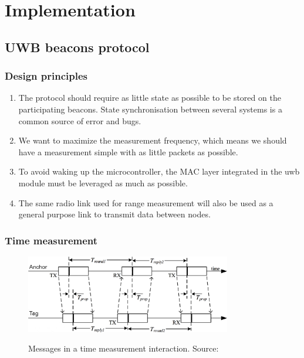 \documentclass[a4paper, 12pt]{scrreprt}
\begin{document}
\chapter{Implementation}

\section{UWB beacons protocol}

\subsection{Design principles}

\begin{enumerate}
    \item The protocol should require as little state as possible to be stored on the participating beacons.
        State synchronisation between several systems is a common source of error and bugs.
    \item We want to maximize the measurement frequency, which means we should have a measurement simple with as little packets as possible.
    \item To avoid waking up the microcontroller, the MAC layer integrated in the \gls{uwb} module must be leveraged as much as possible.
    \item The same radio link used for range measurement will also be used as a general purpose link to transmit data between nodes.
\end{enumerate}

\subsection{Time measurement}

\begin{figure}[h]
    \centering
    \includegraphics[width=0.8\textwidth]{figures/ranging_protocol.png}
    \label{fig:ranging_protocol}
    \caption[Ranging protocol]{Messages in a time measurement interaction. Source:~\cite{dw1000manual}}
\end{figure}
\end{document}
